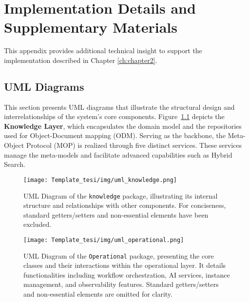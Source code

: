 
\chapter{Implementation Details and Supplementary Materials}
\label{appendix_details}

This appendix provides additional technical insight to support the implementation described in Chapter \ref{ch:chapter2}.


\section*{UML Diagrams}

This section presents UML diagrams that illustrate the structural design and interrelationships of the system's core components. Figure~\ref{fig:uml_knowledge} depicts the \textbf{Knowledge Layer}, which encapsulates the domain model and the repositories used for Object-Document mapping (ODM). Serving as the backbone, the Meta-Object Protocol (MOP) is realized through five distinct services. These services manage the meta-models and facilitate advanced capabilities such as Hybrid Search.


\begin{figure}
  \centering
  \begin{adjustbox}{center}
    \texttt{[image: Template\_tesi/img/uml\_knowledge.png]}
  \end{adjustbox}
    \caption{UML Diagram of the \texttt{knowledge} package, illustrating its internal structure and relationships with other components. For conciseness, standard getters/setters and non-essential elements have been excluded.}
    \label{fig:uml_knowledge}
\end{figure}


\begin{figure}
  \centering
  \begin{adjustbox}{center}
    \texttt{[image: Template\_tesi/img/uml\_operational.png]}
  \end{adjustbox}
\caption{UML Diagram of the \texttt{Operational} package, presenting the core classes and their interactions within the operational layer. It details functionalities including workflow orchestration, AI services, instance management, and observability features. Standard getters/setters and non-essential elements are omitted for clarity.}
    \label{fig:uml_operational}
\end{figure}



